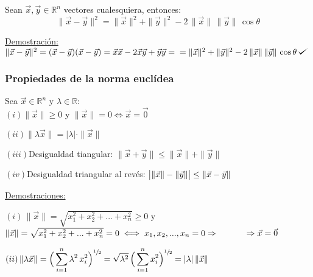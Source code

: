 \documentclass[10pt, titlepage]{article}
\def\checkmark{\tikz\fill[scale=0.4](0,.35) -- (.25,0) -- (1,.7) -- (.25,.15) -- cycle;}
\newcommand{\dindent}{\indent\indent}
\begin{document}
Sean $\vec{x}, \vec{y} \in \mathbb{R}^n$ vectores cualesquiera, entonces:
\[
\boxed{
\|\vec{x} - \vec{y}\|^2 = \|\vec{x}\|^2 + \|\vec{y}\|^2 - 2 \, \|\vec{x}\| \, \|\vec{y}\| \, \cos{\theta}
}
\]
\vspace{3mm}

\underline{Demostración:} $\|\vec{x} - \vec{y}\|^2 = (\vec{x} - \vec{y}) (\vec{x} - \vec{y}) = \vec{x} \vec{x} - 2 \vec{x} \vec{y} + \vec{y} \vec{y} = \vspace{1mm} \\ 
=\|\vec{x}\|^2 + \|\vec{y}\|^2 - 2 \, \|\vec{x}\| \, \|\vec{y}\| \, \cos{\theta} \, \checkmark$

\vspace{3mm}


\subsubsection*{Propiedades de la norma euclídea}

Sea $\vec{x} \in \mathbb{R}^n$ y $\lambda \in \mathbb{R}$: \\ 

$(i) \|\vec{x}\| \geq 0$ y $ \|\vec{x}\| = 0 \iff \vec{x} = \vec{0}$ \vspace{3mm}

$(ii) \| \lambda \vec{x}\| = |\lambda| \cdot \|\vec{x}\|$ \vspace{3mm}

$(iii)$Desigualdad tiangular: $\|\vec{x} + \vec{y}\| \leq \|\vec{x}\| + \|\vec{y}\|$ \vspace{3mm}

$(iv)$Desigualdad triangular al revés: $\big{|} \|\vec{x}\| - \|\vec{y}\|\big{|} \leq \|\vec{x}- \vec{y}\|$
\vspace{5mm}

\underline{Demostraciones:}
\vspace{5mm}

\dindent $(i) \, \|\vec{x}\| = \sqrt{x_1^2 + x_2^2+...+ x_n^2} \geq 0$ y $ \|\vec{x}\| = \sqrt{x_1^2 + 
x_2^2 + ...+ x_n^2} = 0 \iff x_1, x_2,..., x_n = 0  \Rightarrow \\ \dindent \Rightarrow \vec{x} = \vec{0}$
\vspace{3mm}

\dindent $(ii) \, \displaystyle \|\lambda \vec{x}\| = \Big{(} \sum_{i=1}^n \lambda ^2 \, x_i^2 \Big{)} 
^{\sfrac{1}{2}} = \sqrt{\lambda^2} \, \Big{(} \sum_{i=1}^n x_i^2 \Big{)}^{\sfrac{1}{2}} = |\lambda| \, 
\|\vec{x}\|$
\vspace{3mm}
\end{document}

